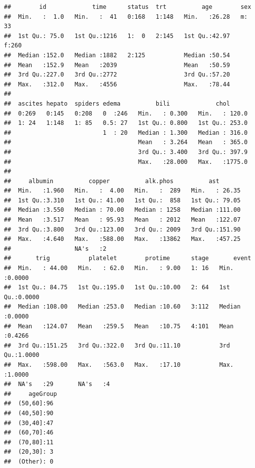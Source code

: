 \documentclass[]{article}
\begin{document}
\begin{verbatim}
##        id             time      status  trt          age        sex    
##  Min.   :  1.0   Min.   :  41   0:168   1:148   Min.   :26.28   m: 33  
##  1st Qu.: 75.0   1st Qu.:1216   1:  0   2:145   1st Qu.:42.97   f:260  
##  Median :152.0   Median :1882   2:125           Median :50.54          
##  Mean   :152.9   Mean   :2039                   Mean   :50.59          
##  3rd Qu.:227.0   3rd Qu.:2772                   3rd Qu.:57.20          
##  Max.   :312.0   Max.   :4556                   Max.   :78.44          
##                                                                        
##  ascites hepato  spiders edema          bili             chol       
##  0:269   0:145   0:208   0  :246   Min.   : 0.300   Min.   : 120.0  
##  1: 24   1:148   1: 85   0.5: 27   1st Qu.: 0.800   1st Qu.: 253.0  
##                          1  : 20   Median : 1.300   Median : 316.0  
##                                    Mean   : 3.264   Mean   : 365.0  
##                                    3rd Qu.: 3.400   3rd Qu.: 397.9  
##                                    Max.   :28.000   Max.   :1775.0  
##                                                                     
##     albumin          copper          alk.phos          ast        
##  Min.   :1.960   Min.   :  4.00   Min.   :  289   Min.   : 26.35  
##  1st Qu.:3.310   1st Qu.: 41.00   1st Qu.:  858   1st Qu.: 79.05  
##  Median :3.550   Median : 70.00   Median : 1258   Median :111.00  
##  Mean   :3.517   Mean   : 95.93   Mean   : 2012   Mean   :122.07  
##  3rd Qu.:3.800   3rd Qu.:123.00   3rd Qu.: 2009   3rd Qu.:151.90  
##  Max.   :4.640   Max.   :588.00   Max.   :13862   Max.   :457.25  
##                  NA's   :2                                        
##       trig           platelet        protime      stage       event       
##  Min.   : 44.00   Min.   : 62.0   Min.   : 9.00   1: 16   Min.   :0.0000  
##  1st Qu.: 84.75   1st Qu.:195.0   1st Qu.:10.00   2: 64   1st Qu.:0.0000  
##  Median :108.00   Median :253.0   Median :10.60   3:112   Median :0.0000  
##  Mean   :124.07   Mean   :259.5   Mean   :10.75   4:101   Mean   :0.4266  
##  3rd Qu.:151.25   3rd Qu.:322.0   3rd Qu.:11.10           3rd Qu.:1.0000  
##  Max.   :598.00   Max.   :563.0   Max.   :17.10           Max.   :1.0000  
##  NA's   :29       NA's   :4                                               
##     ageGroup 
##  (50,60]:96  
##  (40,50]:90  
##  (30,40]:47  
##  (60,70]:46  
##  (70,80]:11  
##  (20,30]: 3  
##  (Other): 0
\end{verbatim}
\end{document}
